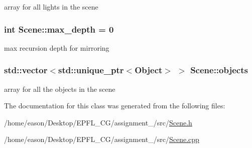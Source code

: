 array for all lights in the scene 

\subsubsection[{\texorpdfstring{max\+\_\+depth}{max_depth}}]{\setlength{\rightskip}{0pt plus 5cm}int Scene\+::max\+\_\+depth = 0\hspace{0.3cm}{\ttfamily [private]}}\hypertarget{classScene_a9150039f4d2c46a617b51c7920142d52}{}\label{classScene_a9150039f4d2c46a617b51c7920142d52}


max recursion depth for mirroring 

\subsubsection[{\texorpdfstring{objects}{objects}}]{\setlength{\rightskip}{0pt plus 5cm}std\+::vector$<$std\+::unique\+\_\+ptr$<${\bf Object}$>$ $>$ Scene\+::objects\hspace{0.3cm}{\ttfamily [private]}}\hypertarget{classScene_abbd6f5b3a4639c3b089037519085bf86}{}\label{classScene_abbd6f5b3a4639c3b089037519085bf86}


array for all the objects in the scene 



The documentation for this class was generated from the following files\+:\begin{DoxyCompactItemize}
\item 
/home/eason/\+Desktop/\+E\+P\+F\+L\+\_\+\+C\+G/assignment\+\_/src/\hyperlink{Scene_8h}{Scene.\+h}\item 
/home/eason/\+Desktop/\+E\+P\+F\+L\+\_\+\+C\+G/assignment\+\_/src/\hyperlink{Scene_8cpp}{Scene.\+cpp}\end{DoxyCompactItemize}
